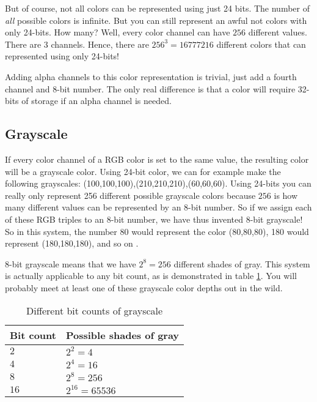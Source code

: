 \begin{refsection}
  But of course, not all colors can be represented using just
  24 bits. The number of \textit{all} possible colors is infinite. But you can still
  represent an awful not colors with only 24-bits. How many? Well, every
  color channel can have $256$ different values. There are $3$
  channels. Hence, there are $256^3 = 16777216$ different colors that
  can represented using only 24-bits!

  \newcommand{\rgbaquad}[4]{
    \mbox{(\textcolor{red}{#1},\textcolor{green}{#2},\textcolor{blue}{#3},\textcolor{gray}{#4})}}

  Adding alpha channels to this color representation is trivial, just
  add a fourth channel and 8-bit number. The only real
  difference is that a color will require 32-bits of storage if an
  alpha channel is needed.

  \subsection{Grayscale}
  \label{sec:other-colors-depths}

  \newcommand{\selfrgbtrip}[3]{\mbox{\textcolor[RGB]{#1,#2,#3}{(#1,#2,#3)}}}
  \newcommand{\selfrgbtripgray}[1]{\selfrgbtrip{#1}{#1}{#1}}

  If every color channel of a RGB color is set to the same value, the
  resulting color will be a grayscale color. Using 24-bit color, we can for example make the following
  grayscales:
  \selfrgbtripgray{100},\selfrgbtripgray{210},\selfrgbtripgray{60}. Using
  24-bits you can really only represent 256 different possible
  grayscale colors because $256$ is how many different values can be
  represented by an 8-bit number. So if we assign each of these RGB
  triples to an 8-bit number, we have thus invented 8-bit
  grayscale! So in this system, the number 80
  would represent the color \selfrgbtripgray{80}, 180 would represent
  \selfrgbtripgray{180}, and so on \cite{puglia00:_handbook_dig_proj}.

  8-bit grayscale means that we have $2^8=256$ different shades of
  gray. This system is actually applicable to any bit count, as is
  demonstrated in table \ref{tab:grayscale}. You will probably meet at least one of
  these grayscale color depths out in the wild.

  \begin{table}
    \centering
    \begin{tabular}{ll}
      \toprule
      Bit count & Possible shades of gray \\
      \midrule
      $2$ & $2^2 = 4$ \\
      $4$ & $2^4 = 16$ \\
      $8$ & $2^8 = 256$ \\
      $16$ & $2^{16} = 65536$ \\
      \bottomrule
    \end{tabular}
    \caption{Different bit counts of grayscale}
    \label{tab:grayscale}
  \end{table}


\end{refsection}
